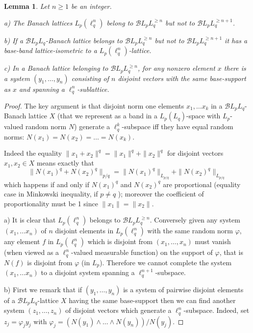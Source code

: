 \documentclass[11pt]{amsart}
\theoremstyle{plain}
\newtheorem{lemma}[theorem]{Lemma}
\theoremstyle{remark}
\newcommand{\ph}{\varphi}
\begin{document}
\begin{lemma}\label{fiber-dlmension} Let $n\ge 1$ be an integer.

a) The Banach lattices $L_p(\ell_q^n)$ belong to $\mathcal BL_pL_q^{\ge n}$ but not to $\mathcal BL_pL_q^{\ge n+1}$.

b) If a $\mathcal BL_pL_q$-Banach lattice belongs to $\mathcal BL_pL_q^{\ge n}$ but not to $\mathcal BL_pL_q^{\ge n+1}$ it has a base-band lattice-isometric to a $L_p(\ell_q^n)$-lattice. 

c) In a Banach lattice belonging to $\mathcal BL_pL_q^{\ge n}$, for any nonzero element $x$ there is a system $(y_1,\dots,y_n)$ consisting of $n$ disjoint vectors with the same base-support as $x$ and  spanning  a $\ell_q^n$-sublattice.\end{lemma}

\begin{proof}
The key argument is that disjoint norm one elements $x_1,\dots x_k$ in a $\mathcal BL_pL_q$-Banach lattice $X$ (that we represent as a band in a $L_p(L_q)$-space with $L_p$-valued random norm $N$) generate a  $\ell_q^k$-subspace iff they have equal random norms: $N(x_1)=N(x_2)=\dots =N(x_k)$. 

Indeed the equality $\|x_1+x_2\|^q=\|x_1\|^q+\|x_2\|^q$ for disjoint vectors $x_1,x_2\in X$ means exactly that 
\[ \|N(x_1)^q+N(x_2)^q\|_{p/q}= \|N(x_1)^q\|_{L_{p/q}}+\|N(x_2)^q\|_{L_{p/q}}\]
which happens if and only if $N(x_1)^q$ and $N(x_2)^q$ are proportional (equality case in Minkowski inequality, if $p\ne q$ ); moreover  the coefficient of proportionality must be 1 since $\|x_1\|=\|x_2\|$.

a) It is clear that $L_p(\ell_q^n)$ belongs to $\mathcal BL_pL_q^{\ge n}$. Conversely given any system   $(x_1,\dots x_n)$ of $n$ disjoint  elements in $L_p(\ell_q^n)$ with the same random norm $\varphi$, any  element $f$ in $L_p(\ell_q^n)$ which is disjoint from $(x_1,\dots, x_n)$ must vanish (when viewed as a $\ell_q^n$-valued measurable function) on the support of $\varphi$, that is $N(f)$ is disjoint from $\ph$ (in $L_p$). Therefore we cannot complete the system $(x_1,\dots x_n)$ to a disjoint system spanning  a $\ell_q^{n+1}$-subspace.

b) First we remark that if $(y_1,\dots,y_n)$ is a system  of pairwise disjoint elements of a $\mathcal BL_pL_q$-lattice $X$  having the same base-support then we can find another  system  $(z_1,\dots,z_n)$ of disjoint vectors which generate a $\ell_q^n$-subspace. Indeed, set $z_j=\ph_j y_j$ with $\ph_j= (N(y_1)\wedge \dots\wedge N(y_n))/N(y_j)$.



\end{proof}
\end{document}
